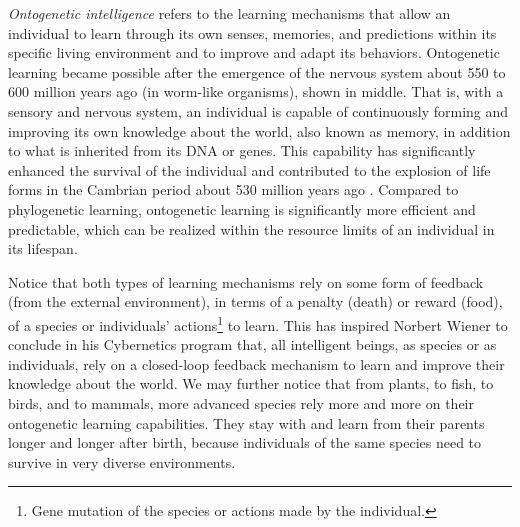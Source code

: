 \documentclass[../../book-main.tex]{subfiles}
\begin{document}
{\em Ontogenetic intelligence} refers to the learning mechanisms that allow an individual to learn through its own senses, memories, and predictions within its specific living environment and to improve and adapt its behaviors. Ontogenetic learning became possible after the emergence of the nervous system about 550 to 600 million years ago (in worm-like organisms), shown in  middle. That is, with a sensory and nervous system, an individual is capable of continuously forming and improving its own knowledge about the world, also known as memory, in addition to what is inherited from its DNA or genes. This capability has significantly enhanced the survival of the individual and contributed to the explosion of life forms in the Cambrian period about 530 million years ago \cite{Parker-2004}. Compared to phylogenetic learning, ontogenetic learning is significantly more efficient and predictable, which can be realized within the resource limits of an individual in its lifespan.

Notice that both types of learning mechanisms rely on some form of feedback (from the external environment), in terms of a penalty (death) or reward (food), of a species or individuals' actions\footnote{Gene mutation of the species or actions made by the individual.} to learn. This has inspired Norbert Wiener to conclude in his Cybernetics program \cite{Wiener-Cybernetics-1948} that, all intelligent beings, as species or as individuals, rely on a closed-loop feedback mechanism to learn and improve their knowledge about the world. We may further notice that from plants, to fish, to birds, and to mammals, more advanced species rely more and more on their ontogenetic learning capabilities. They stay with and learn from their parents longer and longer after birth, because individuals of the same species need to survive in very diverse environments. 
\end{document}
